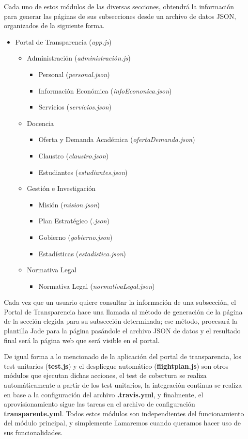 \bigskip
Cada uno de estos módulos de las diversas secciones, obtendrá la información para generar las páginas de sus subsecciones 
desde un archivo de datos JSON, organizados de la siguiente forma.

\begin{itemize}
 \item Portal de Transparencia (\textit{app.js})
 \begin{itemize}
  \item Administración (\textit{administración.js})
  \begin{itemize}
   \item Personal (\textit{personal.json})
   \item Información Económica (\textit{infoEcononica.json})
   \item Servicios (\textit{servicios.json})
  \end{itemize}
  \item Docencia
  \begin{itemize}
   \item Oferta y Demanda Académica (\textit{ofertaDemanda.json})
   \item Claustro (\textit{claustro.json})
   \item Estudiantes (\textit{estudiantes.json})
  \end{itemize}
  \item Gestión e Investigación
  \begin{itemize}
   \item Misión (\textit{mision.json})
   \item Plan Estratégico (\textit{.json})
   \item Gobierno (\textit{gobierno.json})
   \item Estadísticas (\textit{estadistica.json})
  \end{itemize}
  \item Normativa Legal
  \begin{itemize}
   \item Normativa Legal (\textit{normativaLegal.json})
  \end{itemize}
 \end{itemize}
\end{itemize}

Cada vez que un usuario quiere consultar la información de una subsección, el Portal de Transparencia hace una llamada al método
de generación de la página de la sección elegida para su subsección determinada; ese método, procesará la plantilla Jade para la
página pasándole el archivo JSON de datos y el resultado final será la página web que será visible en el portal.

\bigskip
De igual forma a lo mencionado de la aplicación del portal de transparencia, los test unitarios (\textbf{test.js}) y el 
despliegue automático (\textbf{flightplan.js}) son otros módulos que ejecutan dichas acciones, el test de cobertura se realiza
automáticamente a partir de los test unitarios, la integración continua se realiza en base a la configuración del archivo 
\textbf{.travis.yml}, y finalmente, el aprovisionamiento sigue las tareas en el archivo de configuración 
\textbf{transparente.yml}. Todos estos módulos son independientes del funcionamiento del módulo principal, y simplemente 
llamaremos cuando queramos hacer uso de sus funcionalidades.